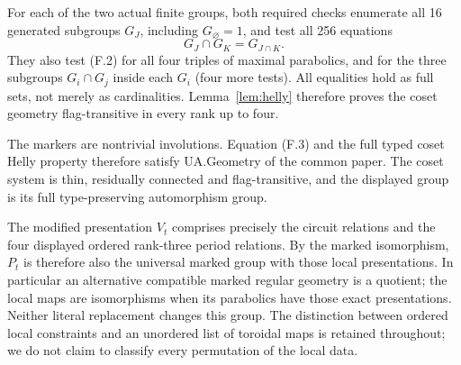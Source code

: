 For each of the two actual finite groups, both required checks enumerate
all 16 generated subgroups $G_J$, including $G_\varnothing=1$, and
test all 256 equations
\[
 G_J\cap G_K=G_{J\cap K}.                              \tag{F.3}
\]
They also test (F.2) for all four triples of maximal parabolics, and for
the three subgroups $G_i\cap G_j$ inside each $G_i$ (four more tests).
All equalities hold as full sets, not merely as cardinalities.
Lemma~\ref{lem:helly} therefore proves the coset geometry flag-transitive
in every rank up to four.

The markers are nontrivial involutions. Equation (F.3) and the full typed
coset Helly property therefore satisfy UA.Geometry of the common paper.
The coset system is thin, residually connected and flag-transitive, and
the displayed group is its full type-preserving automorphism group.

The modified presentation $V_t$ comprises precisely the circuit
relations and the four displayed ordered rank-three period relations.
By the marked isomorphism, $P_t$ is therefore also the
universal marked group with those local presentations. In particular
an alternative compatible marked regular geometry is a quotient;
the local maps are isomorphisms when its parabolics have those exact
presentations. Neither literal replacement changes this group.
The distinction between ordered local constraints and an unordered
list of toroidal maps is retained throughout; we do not claim to
classify every permutation of the local data.

